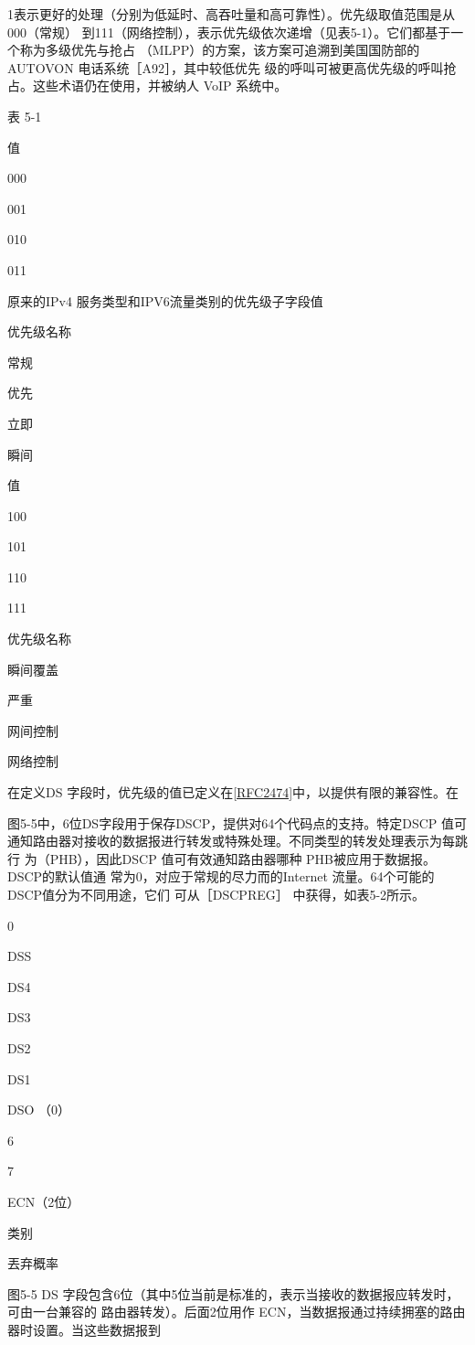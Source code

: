 1表示更好的处理（分别为低延时、高吞吐量和高可靠性）。优先级取值范围是从000（常规）
到111（网络控制），表示优先级依次递增（见表5-1）。它们都基于一个称为多级优先与抢占
（MLPP）的方案，该方案可追溯到美国国防部的AUTOVON 电话系统［A92］，其中较低优先
级的呼叫可被更高优先级的呼叫抢占。这些术语仍在使用，并被纳人 VoIP 系统中。

表 5-1

值

000

001

010

011

原来的IPv4 服务类型和IPV6流量类别的优先级子字段值

优先级名称

常规

优先

立即

瞬间

值

100

101

110

111

优先级名称

瞬间覆盖

严重

网间控制

网络控制

在定义DS 字段时，优先级的值已定义在\href{https://www.rfc-editor.org/rfc/rfc2474}{[RFC2474]}中，以提供有限的兼容性。在

图5-5中，6位DS字段用于保存DSCP，提供对64个代码点的支持。特定DSCP 值可
通知路由器对接收的数据报进行转发或特殊处理。不同类型的转发处理表示为每跳行
为（PHB），因此DSCP 值可有效通知路由器哪种 PHB被应用于数据报。DSCP的默认值通
常为0，对应于常规的尽力而的Internet 流量。64个可能的DSCP值分为不同用途，它们
可从［DSCPREG］ 中获得，如表5-2所示。

0

DSS

DS4

DS3

DS2

DS1

DSO （0）

6

7

ECN（2位）

类别

丟弃概率

图5-5 DS 字段包含6位（其中5位当前是标准的，表示当接收的数据报应转发时，可由一台兼容的
路由器转发）。后面2位用作 ECN，当数据报通过持续拥塞的路由器时设置。当这些数据报到

